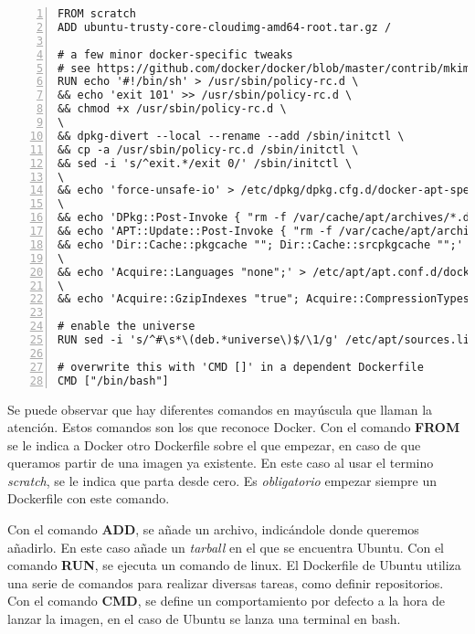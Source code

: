 	\begin{lstlisting}[style=consola,numbers=left]
FROM scratch
ADD ubuntu-trusty-core-cloudimg-amd64-root.tar.gz /

# a few minor docker-specific tweaks
# see https://github.com/docker/docker/blob/master/contrib/mkimage/debootstrap
RUN echo '#!/bin/sh' > /usr/sbin/policy-rc.d \
&& echo 'exit 101' >> /usr/sbin/policy-rc.d \
&& chmod +x /usr/sbin/policy-rc.d \
\
&& dpkg-divert --local --rename --add /sbin/initctl \
&& cp -a /usr/sbin/policy-rc.d /sbin/initctl \
&& sed -i 's/^exit.*/exit 0/' /sbin/initctl \
\
&& echo 'force-unsafe-io' > /etc/dpkg/dpkg.cfg.d/docker-apt-speedup \
\
&& echo 'DPkg::Post-Invoke { "rm -f /var/cache/apt/archives/*.deb /var/cache/apt/archives/partial/*.deb /var/cache/apt/*.bin || true"; };' > /etc/apt/apt.conf.d/docker-clean \
&& echo 'APT::Update::Post-Invoke { "rm -f /var/cache/apt/archives/*.deb /var/cache/apt/archives/partial/*.deb /var/cache/apt/*.bin || true"; };' >> /etc/apt/apt.conf.d/docker-clean \
&& echo 'Dir::Cache::pkgcache ""; Dir::Cache::srcpkgcache "";' >> /etc/apt/apt.conf.d/docker-clean \
\
&& echo 'Acquire::Languages "none";' > /etc/apt/apt.conf.d/docker-no-languages \
\
&& echo 'Acquire::GzipIndexes "true"; Acquire::CompressionTypes::Order:: "gz";' > /etc/apt/apt.conf.d/docker-gzip-indexes

# enable the universe
RUN sed -i 's/^#\s*\(deb.*universe\)$/\1/g' /etc/apt/sources.list

# overwrite this with 'CMD []' in a dependent Dockerfile
CMD ["/bin/bash"]
	\end{lstlisting}

	Se puede observar que hay diferentes comandos en mayúscula que llaman la atención. Estos comandos son los que reconoce Docker. Con el comando \textbf{FROM} se le indica a Docker otro Dockerfile sobre el que empezar, en caso de que queramos partir de una imagen ya existente. En este caso al usar el termino \textit{scratch}, se le indica que parta desde cero. Es \emph{obligatorio} empezar siempre un Dockerfile con este comando.
	
	Con el comando \textbf{ADD}, se añade un archivo, indicándole donde queremos añadirlo. En este caso añade un \textit{tarball} en el que se encuentra Ubuntu. Con el comando \textbf{RUN}, se ejecuta un comando de linux. El Dockerfile de Ubuntu utiliza una serie de comandos para realizar diversas tareas, como definir repositorios. Con el comando \textbf{CMD}, se define un comportamiento por defecto a la hora de lanzar la imagen, en el caso de Ubuntu se lanza una terminal en bash.
	

